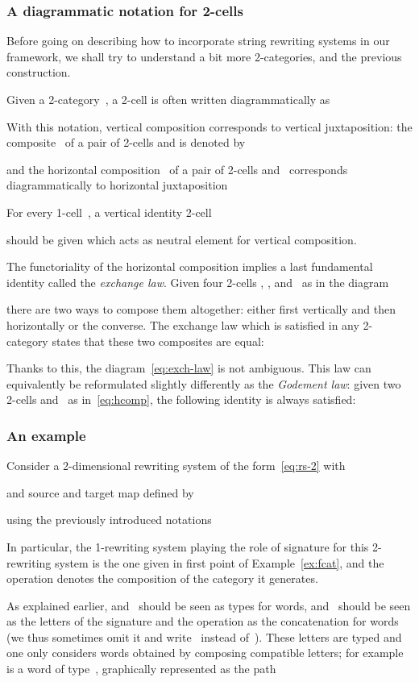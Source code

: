\documentclass{LMCS}
\begin{document}
\subsubsection{A diagrammatic notation for 2-cells}
\label{sec:2-cells}
Before going on describing how to incorporate string rewriting systems in our
framework, we shall try to understand a bit more 2-categories, and the previous
construction.

Given a 2-category~, a 2-cell  is often written
diagrammatically as

With this notation, vertical composition corresponds to vertical juxtaposition:
the composite~ of a pair of 2-cells  and  is denoted by

and the horizontal composition~ of a pair of 2-cells  and~ corresponds diagrammatically to horizontal juxtaposition

For every 1-cell~, a vertical identity 2-cell

should be given which acts as neutral element for vertical composition.

The functoriality of the horizontal composition implies a last fundamental
identity called the \emph{exchange law}. Given four 2-cells , ,
 and~ as in the diagram

there are two ways to compose them altogether: either first vertically and then
horizontally or the converse. The exchange law which is satisfied in any
2-category states that these two composites are equal:

Thanks to this, the diagram~\eqref{eq:exch-law} is not ambiguous. This law can
equivalently be reformulated slightly differently as the \emph{Godement law}:
given two 2-cells  and~ as in~\eqref{eq:hcomp}, the following
identity is always satisfied:


\subsubsection{An example}
\label{sec:rs-2-ex}
Consider a 2-dimensional rewriting system of the form~\eqref{eq:rs-2} with

and source and target map defined by

\ie using the previously introduced notations

In particular, the 1-rewriting system playing the role of signature for this
2-rewriting system is the one given in first point of Example~\ref{ex:fcat}, and
the~ operation denotes the composition of the category it generates.

As explained earlier,  and~ should be seen as types for words,  and~
should be seen as the letters of the signature and the  operation as
the concatenation for words (we thus sometimes omit it and write~ instead
of~). These letters are typed and one only considers words obtained
by composing compatible letters; for example~ is a word of
type~, graphically represented as the path
\end{document}
